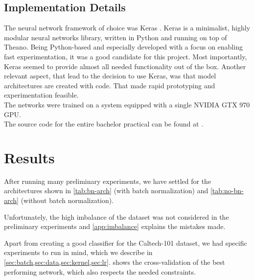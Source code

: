 \documentclass[a4paper, 11pt]{article}
\begin{document}
\subsection{Implementation Details}
The neural network framework of choice was Keras \cite{keras}.
Keras is a minimalist, highly modular neural networks library, written in Python and running on top of Theano.
Being Python-based and especially developed with a focus on enabling fast experimentation, it was a good candidate for this project.
Most importantly, Keras seemed to provide almost all needed functionality out of the box.
Another relevant aspect, that lead to the decision to use Keras, was that model architectures are created with code.
That made rapid prototyping and experimentation feasible.\\

The networks were trained on a system equipped with a single NVIDIA GTX 970 GPU.\\

The source code for the entire bachelor practical can be found at \cite{UnternaehrerCode}.

\section{Results}
After running many preliminary experiments, we have settled for the architectures shown in \cref{tab:bn-arch} (with batch normalization) and \cref{tab:no-bn-arch} (without batch normalization).

Unfortunately, the high imbalance of the dataset was not considered in the preliminary experiments and \cref{app:imbalance} explains the mistakes made.

Apart from creating a good classifier for the Caltech-101 dataset, we had specific experiments to run in mind, which we describe in \cref{sec:batch,sec:data,sec:kernel,sec:lr}.
 shows the cross-validation of the best performing network, which also respects the needed constraints.
\end{document}
